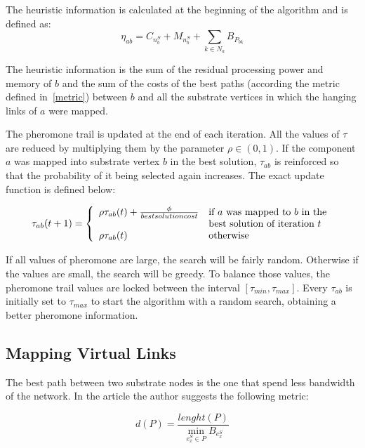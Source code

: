 \documentclass[11pt, a4paper]{article}
\begin{document}
The heuristic information is calculated at the beginning of the algorithm and is defined as:
\begin{equation}
  \eta_{ab} = C_{n^{S}_{b}} + M_{n^{S}_{b}} + \sum_{k \in N_{a}} B_{P_{bk}}
\end{equation}

The heuristic information is the sum of the residual processing power and memory of $b$ and the sum of the costs of the best paths (according the metric defined in~\ref{metric}) between $b$ and all the substrate vertices in which the hanging links of $a$ were mapped. 

The pheromone trail is updated at the end of each iteration. All the values of $\tau$ are reduced by multiplying them by the parameter $\rho \in (0,1)$. If the component $a$ was mapped into substrate vertex $b$ in the best solution, $\tau_{ab}$ is reinforced so that the probability of it being selected again increases. The exact update function is defined below:

\begin{equation}
  \tau_{ab}(t+1) = \left\{  
  \begin{array}{l l}
    \rho \tau_{ab}(t) + \frac{\phi}{best solution cost} & \text{if $a$ was mapped to $b$ in the}\\
                                                        & \text{best solution of iteration $t$} \\
    \rho \tau_{ab}(t) & \text{otherwise}
  \end{array}\right .
\end{equation}

If all values of pheromone are large, the search will be fairly random. Otherwise if the values are small, the search will be greedy. To balance those values, the pheromone trail values are locked between the interval $[\tau_{min},\tau_{max}]$. Every $\tau_{ab}$ is initially set to $\tau_{max}$ to start the algorithm with a random search, obtaining a better pheromone information.

\subsection{Mapping Virtual Links} \label{path}
The best path between two substrate nodes is the one that spend less bandwidth of the network. In the article the author suggests the following metric:

\begin{equation}
  d(P) = \frac{lenght(P)}{\min_{e^{S}_{x}\in P}B_{e^{S}_{x}}}\label{metric}
\end{equation}
\end{document}
